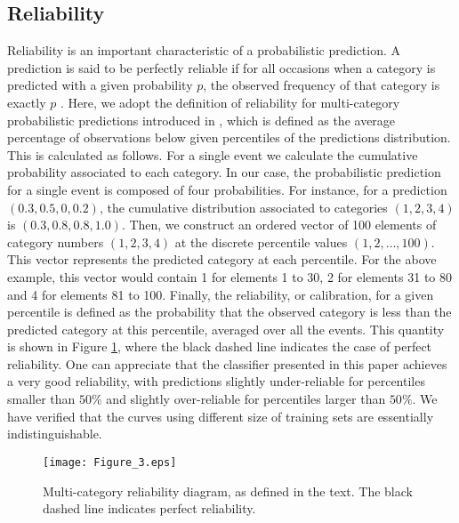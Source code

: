 \documentclass[draft,jgrga]{agutex}
\begin{document}
\begin{article}
\subsection{Reliability}
Reliability is an important characteristic of a probabilistic prediction. A prediction is said to be perfectly reliable if for all occasions when a category is predicted with a given probability $p$, the observed frequency of that category is exactly $p$ \citep{gneiting14}. Here, we adopt the definition of reliability for multi-category probabilistic predictions introduced in \citet{hamill97}, which is defined as the average percentage of observations below given percentiles of the predictions distribution. This is calculated as follows. For a single event we calculate the cumulative probability associated to each category. In our case, the probabilistic prediction for a single event is composed of four probabilities.
For instance, for a prediction $(0.3,0.5,0,0.2)$, the cumulative distribution associated to categories $(1,2,3,4)$ is  $(0.3,0.8,0.8,1.0)$. Then, we construct an ordered vector of 100 elements of category numbers $(1,2,3,4)$ at the discrete percentile values $(1,2,\ldots,100)$. This vector represents the predicted category at each percentile. For the above example, this vector would contain 1 for elements 1 to 30, 2 for elements 31 to 80 and 4 for elements 81 to 100. Finally, the reliability, or calibration, for a given percentile is defined as the probability that the observed category is less than the predicted category at this percentile, averaged over all the events. This quantity is shown in Figure \ref{fig:reliability}, where the black dashed line indicates the case of perfect reliability. One can appreciate that the classifier presented in this paper achieves a very good reliability, with predictions slightly under-reliable for percentiles smaller than $50\%$ and slightly over-reliable for percentiles larger than $50\%$. We have verified that the curves using different size of training sets are essentially indistinguishable. 
\begin{figure}[ht!]
 \centering
 \texttt{[image: Figure\_3.eps]}
\caption{Multi-category reliability diagram, as defined in the text. The black dashed line indicates perfect reliability.}
\label{fig:reliability}
\end{figure}


\end{article}
\end{document}
